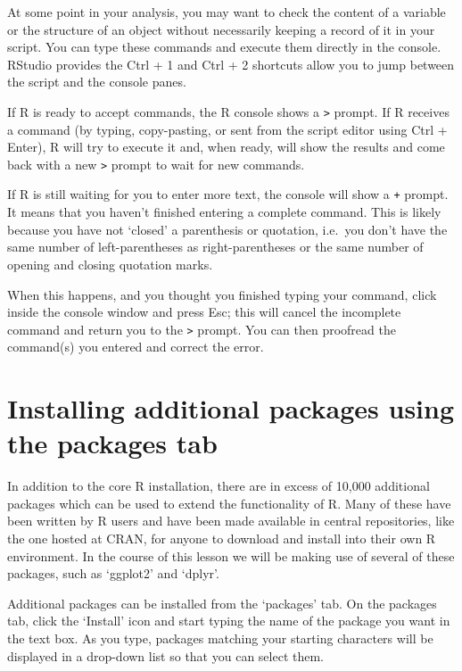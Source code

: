 \documentclass[]{book}
\begin{document}
At some point in your analysis, you may want to check the content of a
variable or the structure of an object without necessarily keeping a
record of it in your script. You can type these commands and execute
them directly in the console. RStudio provides the Ctrl + 1 and Ctrl + 2
shortcuts allow you to jump between the script and the console panes.

If R is ready to accept commands, the R console shows a
\texttt{\textgreater{}} prompt. If R receives a command (by typing,
copy-pasting, or sent from the script editor using Ctrl + Enter), R will
try to execute it and, when ready, will show the results and come back
with a new \texttt{\textgreater{}} prompt to wait for new commands.

If R is still waiting for you to enter more text, the console will show
a \texttt{+} prompt. It means that you haven't finished entering a
complete command. This is likely because you have not `closed' a
parenthesis or quotation, i.e.~you don't have the same number of
left-parentheses as right-parentheses or the same number of opening and
closing quotation marks.

When this happens, and you thought you finished typing your command,
click inside the console window and press Esc; this will cancel the
incomplete command and return you to the \texttt{\textgreater{}} prompt.
You can then proofread the command(s) you entered and correct the error.

\section{Installing additional packages using the packages
tab}\label{installing-additional-packages-using-the-packages-tab}

In addition to the core R installation, there are in excess of 10,000
additional packages which can be used to extend the functionality of R.
Many of these have been written by R users and have been made available
in central repositories, like the one hosted at CRAN, for anyone to
download and install into their own R environment. In the course of this
lesson we will be making use of several of these packages, such as
`ggplot2' and `dplyr'.

Additional packages can be installed from the `packages' tab. On the
packages tab, click the `Install' icon and start typing the name of the
package you want in the text box. As you type, packages matching your
starting characters will be displayed in a drop-down list so that you
can select them.
\end{document}
